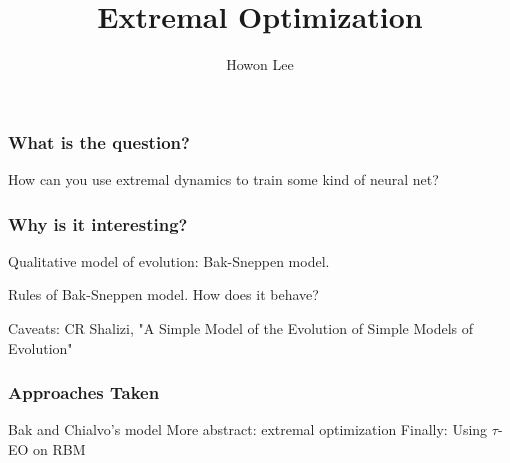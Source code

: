 \documentclass{beamer}
\begin{document}
\title{Extremal Optimization}
\author{Howon Lee}
\maketitle


\begin{frame}
  \frametitle{What is the question?}
  How can you use extremal dynamics to train some kind of neural net?
\end{frame}

\begin{frame}
  \frametitle{Why is it interesting?}
  Qualitative model of evolution: Bak-Sneppen model.

  Rules of Bak-Sneppen model. How does it behave?

  Caveats: CR Shalizi, "A Simple Model of the Evolution of Simple Models of Evolution"
\end{frame}

\begin{frame}
  \frametitle{Approaches Taken}
  Bak and Chialvo's model
  More abstract: extremal optimization
  Finally: Using $\tau$-EO on RBM
\end{frame}
\end{document}
